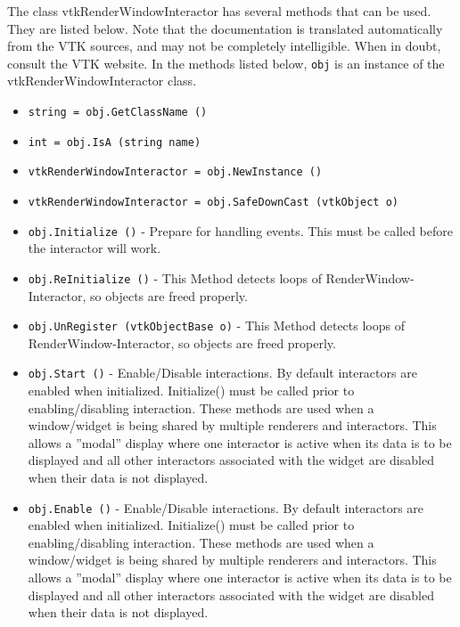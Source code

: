 The class vtkRenderWindowInteractor has several methods that can be used.
  They are listed below.
Note that the documentation is translated automatically from the VTK sources,
and may not be completely intelligible.  When in doubt, consult the VTK website.
In the methods listed below, \verb|obj| is an instance of the vtkRenderWindowInteractor class.
\begin{itemize}
\item  \verb|string = obj.GetClassName ()|

\item  \verb|int = obj.IsA (string name)|

\item  \verb|vtkRenderWindowInteractor = obj.NewInstance ()|

\item  \verb|vtkRenderWindowInteractor = obj.SafeDownCast (vtkObject o)|

\item  \verb|obj.Initialize ()| -  Prepare for handling events. This must be called before the
 interactor will work.

\item  \verb|obj.ReInitialize ()| -  This Method detects loops of RenderWindow-Interactor,
 so objects are freed properly.

\item  \verb|obj.UnRegister (vtkObjectBase o)| -  This Method detects loops of RenderWindow-Interactor,
 so objects are freed properly.

\item  \verb|obj.Start ()| -  Enable/Disable interactions.  By default interactors are enabled when
 initialized.  Initialize() must be called prior to enabling/disabling
 interaction. These methods are used when a window/widget is being
 shared by multiple renderers and interactors.  This allows a ''modal''
 display where one interactor is active when its data is to be displayed
 and all other interactors associated with the widget are disabled
 when their data is not displayed.

\item  \verb|obj.Enable ()| -  Enable/Disable interactions.  By default interactors are enabled when
 initialized.  Initialize() must be called prior to enabling/disabling
 interaction. These methods are used when a window/widget is being
 shared by multiple renderers and interactors.  This allows a ''modal''
 display where one interactor is active when its data is to be displayed
 and all other interactors associated with the widget are disabled
 when their data is not displayed.


\end{itemize}
